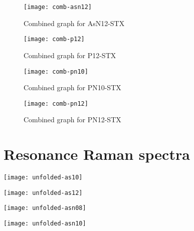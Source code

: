 \newpage

\begin{figure*}[h]
\centering
\begin{subfigure}{8.25cm}\centering\texttt{[image: comb-asn12]}\caption{Combined graph for AsN12-STX}\end{subfigure}%
\begin{subfigure}{8.25cm}\centering\texttt{[image: comb-p12]}\caption{Combined graph for P12-STX}\end{subfigure}
\begin{subfigure}{8.25cm}\centering\texttt{[image: comb-pn10]}\caption{Combined graph for PN10-STX}\end{subfigure}%
\begin{subfigure}{8.25cm}\centering\texttt{[image: comb-pn12]}\caption{Combined graph for PN12-STX}\end{subfigure}
\caption[Part 2 of combined EF RR graphs]{Part 2 of combined EF RR graphs}
\end{figure*}


\newpage
\section{Resonance Raman spectra}

\begin{figure*}[h]
    \texttt{[image: unfolded-as10]}
    \caption[RR spectra of As10-STX]{RR spectra of As10-STX. Selected $\lambda$: \SI{381}{\nano\metre}, \SI{432}{\nano\metre}, \SI{600}{\nano\metre}}
\end{figure*}
\begin{figure*}[h]
    \texttt{[image: unfolded-as12]}
    \caption[RR spectra of As12-STX]{RR spectra of As12-STX. All of the lasers performed very similarly}
\end{figure*}
\begin{figure*}[h]
    \texttt{[image: unfolded-asn08]}
    \caption[RR spectra of AsN08-STX]{RR spectra of AsN08-STX. Selected $\lambda$: \SI{384}{\nano\metre}, \SI{402}{\nano\metre}, \SI{498}{\nano\metre}}
\end{figure*}
\begin{figure*}[h]
    \texttt{[image: unfolded-asn10]}
    \caption[RR spectra of AsN10-STX]{RR spectra of AsN10-STX. All of the tested lasers resulted in similar amplifications}
\end{figure*}


